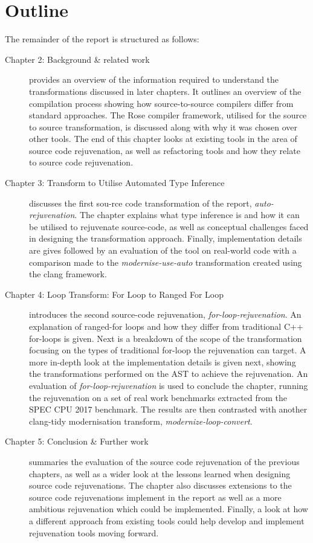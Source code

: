 \documentclass[bsc,frontabs,singlespacing,twoside,parskip,deptreport]{infthesis}
\begin{document}
\section{Outline}
The remainder of the report is structured as follows:
\begin{description}
    \item [Chapter 2: Background \& related work] provides an overview of the information required to understand the transformations discussed in later chapters. It outlines an overview of the compilation process showing how source-to-source compilers differ from standard approaches. The Rose compiler framework, utilised for the source to source transformation, is discussed along with why it was chosen over other tools. The end of this chapter looks at existing tools in the area of source code rejuvenation, as well as refactoring tools and how they relate to source code rejuvenation.
    
    \item [Chapter 3: Transform to Utilise Automated Type Inference] discusses the first sou-rce code transformation of the report, \textit{auto-rejuvenation}. The chapter explains what type inference is and how it can be utilised to rejuvenate source-code, as well as conceptual challenges faced in designing the transformation approach. Finally, implementation details are gives followed by an evaluation of the tool on real-world code with a comparison made to the \textit{modernise-use-auto} transformation created using the clang framework. 
    
    \item [Chapter 4: Loop Transform: For Loop to Ranged For Loop] introduces the second source-code rejuvenation, \textit{for-loop-rejuvenation}. An explanation of ranged-for loops and how they differ from traditional C++ for-loops is given. Next is a breakdown of the scope of the transformation focusing on the types of traditional for-loop the rejuvenation can target. A more in-depth look at the implementation details is given next, showing the transformations performed on the AST to achieve the rejuvenation. An evaluation of \textit{for-loop-rejuvenation} is used to conclude the chapter, running the rejuvenation on a set of real work benchmarks extracted from the SPEC CPU 2017 benchmark. The results are then contrasted with another clang-tidy modernisation transform, \textit{modernize-loop-convert}. 
    
    \item [Chapter 5: Conclusion \& Further work] summaries the evaluation of the source code rejuvenation of the previous chapters, as well as a wider look at the lessons learned when designing source code rejuvenations. The chapter also discusses extensions to the source code rejuvenations implement in the report as well as a more ambitious rejuvenation which could be implemented. Finally, a look at how a different approach from existing tools could help develop and implement rejuvenation tools moving forward.
    
\end{description}
 
\end{document}
